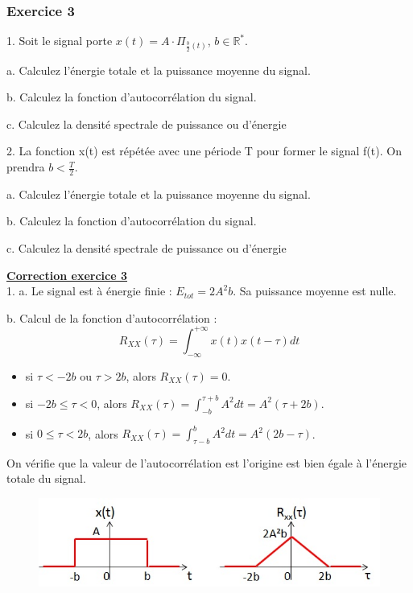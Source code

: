 \documentclass[11pt]{report}
\begin{document}
	
	
	\subsubsection{Exercice 3}
	
	1. Soit le signal porte $x(t)=A\cdot \Pi_{\frac{b}{2}(t)}$, $b\in \mathbb{R^{*}}$.
	
		a. Calculez l'énergie totale et la puissance moyenne du signal.
		
		b. Calculez la fonction d'autocorrélation du signal.
		
		c. Calculez la densité spectrale de puissance ou d'énergie
		
		\vspace{0.5\baselineskip}
	
	2. La fonction x(t) est répétée avec une période T pour former le signal f(t). On prendra $b<\frac{T}{2}$.
	
		a. Calculez l'énergie totale et la puissance moyenne du signal.
		
		b. Calculez la fonction d'autocorrélation du signal.
		
		c. Calculez la densité spectrale de puissance ou d'énergie
	
	\vspace{1\baselineskip}
	
	\textbf{\underline{Correction exercice 3}}\\
	
	1. a. Le signal est à énergie finie : $E_{tot} = 2A^{2}b$. Sa puissance moyenne est nulle.
	
	b. Calcul de la fonction d'autocorrélation :
	\begin{equation*}
	R_{XX}(\tau)=\int_{-\infty}^{+\infty}x(t)x(t-\tau)dt
	\end{equation*}
	\begin{itemize}
		\item si $\tau < -2b$ ou $\tau > 2b$, alors $R_{XX}(\tau)=0$.
		\item si $-2b \leq \tau < 0$, alors $R_{XX}(\tau)=\int_{-b}^{\tau +b}A^{2}dt=A^{2}(\tau+2b)$.
		\item si $0 \leq \tau < 2b$, alors $R_{XX}(\tau)=\int_{\tau-b}^{ b}A^{2}dt=A^{2}(2b-\tau)$. 
	\end{itemize}
	On vérifie que la valeur de l'autocorrélation est l'origine est bien égale à l'énergie totale du signal.

	\begin{figure}[h!]
		\centering
		\includegraphics[scale=0.6]{images/Exo_8_1_1.jpg} 
	\end{figure}
\end{document}
